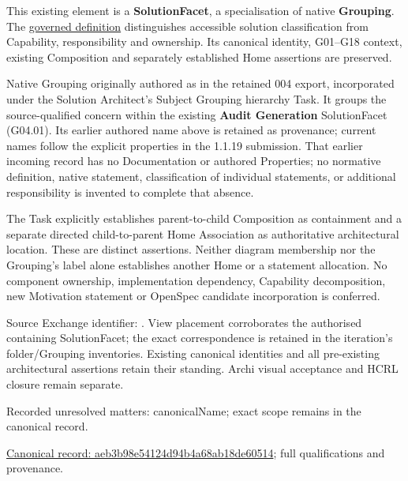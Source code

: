 This existing element is a \textbf{SolutionFacet}, a specialisation of native
\textbf{Grouping}. The \href{\detokenize{../../../../../../../governance/continuum-representation.md#solutionfacet-classification--1119-candidate}}{governed definition}
distinguishes accessible solution classification from Capability, responsibility
and ownership. Its canonical identity, G01–G18 context, existing Composition
and separately established Home assertions are preserved.



Native Grouping originally authored as \texttt{} in the retained 004 export,
incorporated under the Solution Architect's Subject Grouping hierarchy Task.
It groups the source-qualified \texttt{} concern within
the existing \textbf{Audit Generation} SolutionFacet (G04.01). Its earlier authored name above is retained as provenance; current names
follow the explicit properties in the 1.1.19 submission.
That earlier incoming record has no Documentation or authored Properties; no normative
definition, native statement, classification of individual statements, or
additional responsibility is invented to complete that absence.



The Task explicitly establishes parent-to-child Composition as containment and
a separate directed child-to-parent Home Association as authoritative architectural
location. These are distinct assertions. Neither diagram membership nor the
Grouping's label alone establishes another Home or a statement allocation.
No component ownership, implementation dependency, Capability decomposition,
new Motivation statement or OpenSpec candidate incorporation is conferred.



Source Exchange identifier: \texttt{}. View placement corroborates
the authorised containing SolutionFacet; the exact correspondence is retained in the
iteration's folder/Grouping inventories. Existing canonical identities and all
pre-existing architectural assertions retain their standing. Archi visual
acceptance and HCRL closure remain separate.


{\small Recorded unresolved matters: canonicalName; exact scope remains in the canonical record.}\par
{\footnotesize \href{../../../../../../../continuum/grouping/aeb3b98e54124d94b4a68ab18de60514.md}{Canonical record: aeb3b98e54124d94b4a68ab18de60514}; full qualifications and provenance.}\par
